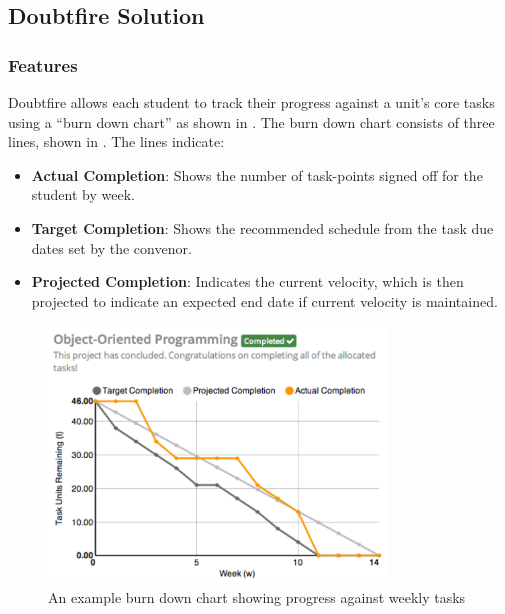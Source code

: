 
\subsection{Doubtfire Solution} %
\label{sub:doubtfire_solution}


\subsubsection{Features} %
\label{ssub:features}

Doubtfire allows each student to track their progress against a unit's core tasks using a ``burn down chart'' as shown in . The burn down chart consists of three lines, shown in . The lines indicate:
\begin{itemize}[noitemsep,nolistsep]
  \item \textbf{Actual Completion}: Shows the number of task-points signed off for the student by week.
  \item \textbf{Target Completion}: Shows the recommended schedule from the task due dates set by the convenor.
  \item \textbf{Projected Completion}: Indicates the current velocity, which is then projected to indicate an expected end date if current velocity is maintained.
\end{itemize}

\begin{figure}[thb]
  \centering
  \includegraphics[width=0.8\textwidth]{ExampleChart}
  \caption{An example burn down chart showing progress against weekly tasks}
  \label{fig:example_chart}
\end{figure}

